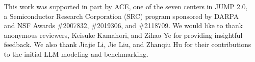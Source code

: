 \begin{acks}
This work was supported in part by ACE, one of the seven centers in JUMP 2.0, a Semiconductor Research Corporation (SRC) program sponsored by DARPA and NSF Awards \#2007832, \#2019306, and \#2118709.
We would like to thank anonymous reviewers, Keisuke Kamahori, and Zihao Ye for providing insightful feedback.
We also thank Jiajie Li, Jie Liu, and Zhanqiu Hu for their contributions to the initial LLM modeling and benchmarking.
\end{acks}